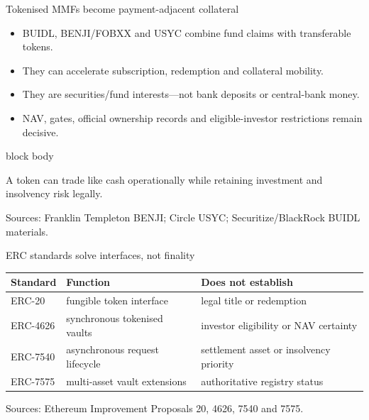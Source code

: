 \documentclass[aspectratio=169,12pt]{beamer}
\newcommand{\source}[1]{\vfill\par\fontsize{5.4}{6.5}\selectfont\color{Quiet}Sources: #1}
\newcommand{\tightitems}{\setlength{\itemsep}{0.42em}\setlength{\parskip}{0pt}}
\newenvironment{statement}{%
  \begin{beamercolorbox}[sep=.18cm,rounded=false,wd=\linewidth]{block body}%
  \fontsize{13}{15.5}\selectfont\bfseries
}{\end{beamercolorbox}}
\begin{document}
\begin{frame}{Tokenised MMFs become payment-adjacent collateral} %
  \begin{itemize}\tightitems
    \item BUIDL, BENJI/FOBXX and USYC combine fund claims with transferable tokens.
    \item They can accelerate subscription, redemption and collateral mobility.
    \item They are securities/fund interests---not bank deposits or central-bank money.
    \item NAV, gates, official ownership records and eligible-investor restrictions remain decisive.
  \end{itemize}
  \begin{statement}
    A token can trade like cash operationally while retaining investment and insolvency risk legally.
  \end{statement}
  \source{Franklin Templeton BENJI; Circle USYC; Securitize/BlackRock BUIDL materials.}
\end{frame}

\begin{frame}{ERC standards solve interfaces, not finality} %
  \begin{tabularx}{\textwidth}{L{2.1cm}Y Y}
    \toprule
    \textbf{Standard} & \textbf{Function} & \textbf{Does not establish} \\
    \midrule
    ERC-20 & fungible token interface & legal title or redemption \\
    ERC-4626 & synchronous tokenised vaults & investor eligibility or NAV certainty \\
    ERC-7540 & asynchronous request lifecycle & settlement asset or insolvency priority \\
    ERC-7575 & multi-asset vault extensions & authoritative registry status \\
    \bottomrule
  \end{tabularx}
  \source{Ethereum Improvement Proposals 20, 4626, 7540 and 7575.}
\end{frame}
\end{document}
